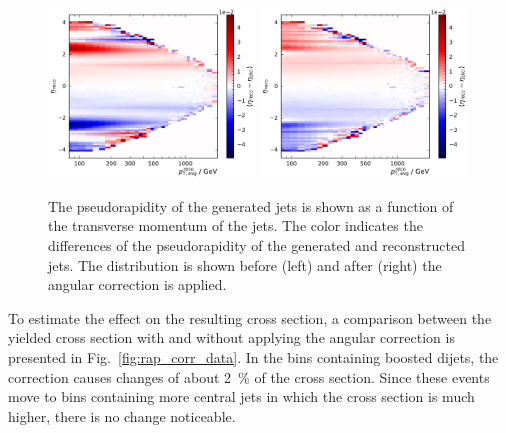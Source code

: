 \begin{figure}[htbp]
    \centering
    \includegraphics[width=0.49\textwidth]{figures/measurement/genvsreco_eta_vs_genpt.pdf}\hfill
    \includegraphics[width=0.49\textwidth]{figures/measurement/genvsreco_eta_vs_genpt_corr.pdf}
    \caption[Differences of pseudorapidity of reconstructed jets and particle level jets as a function of the reconstructed jet \pt]
            {The pseudorapidity of the
            generated jets is shown as a function of the transverse momentum of
            the jets. The color indicates the differences of the pseudorapidity
            of the generated and reconstructed jets. The distribution is shown
            before (left) and after (right) the angular
        correction is applied.}
    \label{fig:jet_eta_corr_vs_pt}
\end{figure}

To estimate the effect on the resulting cross section, a comparison between the
yielded cross section with and without applying the angular correction is
presented in Fig.~\ref{fig:rap_corr_data}. In the bins containing boosted
dijets, the correction causes changes of about \SI{2}{\percent} of the cross
section. Since these events move to bins containing more central jets in which
the cross section is much higher, there is no change noticeable.

